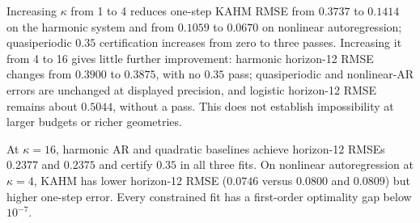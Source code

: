 Increasing $\kappa$ from 1 to 4 reduces one-step KAHM RMSE from $0.3737$ to
$0.1414$ on the harmonic system and from $0.1059$ to $0.0670$ on nonlinear
autoregression; quasiperiodic $0.35$ certification increases from zero to three
passes. Increasing it from 4 to 16 gives little further improvement:
harmonic horizon-12 RMSE changes from $0.3900$ to $0.3875$, with no $0.35$
pass; quasiperiodic and nonlinear-AR errors are unchanged at displayed
precision, and logistic horizon-12 RMSE remains about $0.5044$, without a pass.
This does not establish impossibility at larger budgets or richer geometries.

At $\kappa=16$, harmonic AR and quadratic baselines achieve horizon-12 RMSEs
$0.2377$ and $0.2375$ and certify $0.35$ in all three fits. On nonlinear
autoregression at $\kappa=4$, KAHM has lower horizon-12 RMSE ($0.0746$ versus
$0.0800$ and $0.0809$) but higher one-step error. Every constrained fit has
a first-order optimality gap below $10^{-7}$.
